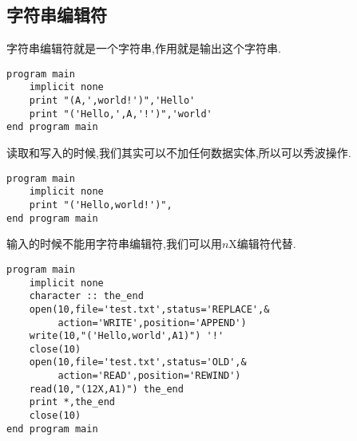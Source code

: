 \subsection{字符串编辑符}\label{character_string_edit_descriptor}

字符串编辑符就是一个字符串,作用就是输出这个字符串.
\begin{lstlisting}
program main
    implicit none
    print "(A,',world!')",'Hello'
    print "('Hello,',A,'!')",'world'
end program main
\end{lstlisting}
读取和写入的时候,我们其实可以不加任何数据实体,所以可以秀波操作.
\begin{lstlisting}
program main
    implicit none
    print "('Hello,world!')",
end program main
\end{lstlisting}
输入的时候不能用字符串编辑符,我们可以用$n$X编辑符代替.
\begin{lstlisting}
program main
    implicit none
    character :: the_end
    open(10,file='test.txt',status='REPLACE',&
         action='WRITE',position='APPEND')
    write(10,"('Hello,world',A1)") '!'
    close(10)
    open(10,file='test.txt',status='OLD',&
         action='READ',position='REWIND')
    read(10,"(12X,A1)") the_end
    print *,the_end
    close(10)
end program main
\end{lstlisting}

